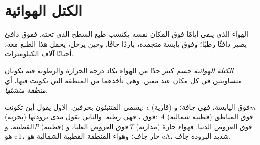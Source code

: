 \section{الكتل الهوائية}

الهواء الذي يبقى أيامًا فوق المكان نفسه يكتسب طبع السطح الذي تحته. ففوق
 دافئ يصير دافئًا رطبًا؛ وفوق يابسة متجمدة، باردًا جافًا. وحين يرحل،
يحمل هذا الطبع معه، أحيانًا آلاف الكيلومترات.

\begin{definition}\label{def:g8:fronts-and-weather-maps:air-mass}
\emph{الكتلة الهوائية} جسم كبير جدًا من الهواء تكاد
درجة الحرارة والرطوبة فيه تكونان متساويتين في كل مكان عند  معين. وهي
تأخذهما من المنطقة التي تكونت فيها، أي \emph{منطقة منشئها}.
\end{definition}

يسمي المتنبئون  بحرفين. الأول يقول أين تكونت: \emph{c}
(قارية) فوق اليابسة، فهي جافة؛ و\emph{m} (بحرية) فوق ، فهي رطبة. والثاني
يقول مدى برودتها: \emph{A} (قطبية شمالية) فوق المناطق القطبية، و\emph{P}
(قطبية) فوق العروض العليا، و\emph{T} (مدارية) فوق العروض الدنيا. فهواء
 حارة هو cT، حار جاف؛ وهواء المنطقة القطبية الشمالية هو cA، شديد البرودة
جاف.

